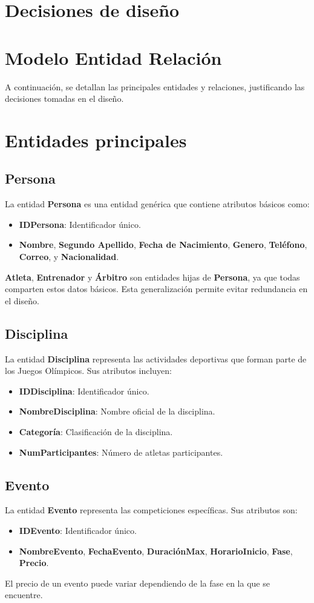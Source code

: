 \section*{Decisiones de diseño}
\section*{Modelo Entidad Relación}
A continuación, se detallan las principales entidades y relaciones, justificando las decisiones tomadas en el diseño.

\section*{Entidades principales}
\subsection*{Persona}
La entidad \textbf{Persona} es una entidad genérica que contiene atributos básicos como:
\begin{itemize}
    \item \textbf{IDPersona}: Identificador único.
    \item \textbf{Nombre}, \textbf{Segundo Apellido}, \textbf{Fecha de Nacimiento}, \textbf{Genero}, \textbf{Teléfono}, \textbf{Correo}, y \textbf{Nacionalidad}.
\end{itemize}

\textbf{Atleta}, \textbf{Entrenador} y \textbf{Árbitro} son entidades hijas de \textbf{Persona}, ya que todas comparten estos datos básicos. Esta generalización permite evitar redundancia en el diseño.

\subsection*{Disciplina}
La entidad \textbf{Disciplina} representa las actividades deportivas que forman parte de los Juegos Olímpicos. Sus atributos incluyen:
\begin{itemize}
    \item \textbf{IDDisciplina}: Identificador único.
    \item \textbf{NombreDisciplina}: Nombre oficial de la disciplina.
    \item \textbf{Categoría}: Clasificación de la disciplina.
    \item \textbf{NumParticipantes}: Número de atletas participantes.
\end{itemize}

\subsection*{Evento}
La entidad \textbf{Evento} representa las competiciones específicas. Sus atributos son:
\begin{itemize}
    \item \textbf{IDEvento}: Identificador único.
    \item \textbf{NombreEvento}, \textbf{FechaEvento}, \textbf{DuraciónMax}, \textbf{HorarioInicio}, \textbf{Fase}, \textbf{Precio}.
\end{itemize}
El precio de un evento puede variar dependiendo de la fase en la que se encuentre.

